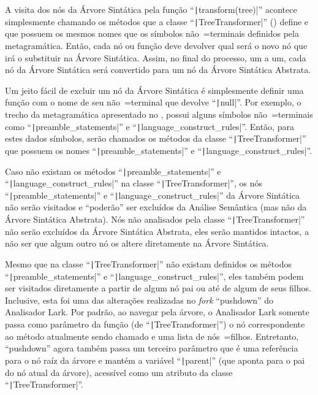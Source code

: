A visita dos nós da Árvore Sintática pela função ``\texttt|transform(tree)|'' acontece simplesmente chamando os métodos que a classe ``\texttt|TreeTransformer|'' () define e
que possuem os mesmos nomes que os símbolos não~=terminais definidos pela metagramática.
Então,
cada nó ou
função deve devolver qual será o novo nó que irá o substituir na Árvore Sintática.
Assim,
no final do processo,
um a um,
cada nó da Árvore Sintática será convertido para um nó da Árvore Sintática Abstrata.

Um jeito fácil de excluir um nó da Árvore Sintática é simplesmente definir uma função com o nome de seu não~=terminal que devolve ``\texttt|null|''.
Por exemplo,
o trecho da metagramática apresentado no ,
possui alguns símbolos não~=terminais como ``\texttt|preamble_statements|'' e
``\texttt|language_construct_rules|''. Então,
para estes dados símbolos,
serão chamados os métodos da classe ``\texttt|TreeTransformer|'' que possuem os nomes ``\texttt|preamble_statements|'' e
``\texttt|language_construct_rules|''.

Caso não existam os métodos ``\texttt|preamble_statements|'' e
``\texttt|language_construct_rules|'' na classe ``\texttt|TreeTransformer|'',
os nós ``\texttt|preamble_statements|'' e
``\texttt|language_construct_rules|'' da Árvore Sintática não serão visitados e
``poderão'' ser excluídos da Análise Semântica (mas não da Árvore Sintática Abstrata).
Nós não analisados pela classe ``\texttt|TreeTransformer|'' não serão excluídos da Árvore Sintática Abstrata,
eles serão mantidos intactos,
a não ser que algum outro nó os altere diretamente na Árvore Sintática.

Mesmo que na classe ``\texttt|TreeTransformer|'' não existam definidos os métodos ``\texttt|preamble_statements|'' e
``\texttt|language_construct_rules|'',
eles também podem ser visitados diretamente a partir de algum nó pai ou
até de algum de seus filhos.
Inclusive,
esta foi uma das alterações realizadas no \textit{fork} ``pushdown'' do Analisador Lark.
Por padrão,
ao navegar pela árvore,
o Analisador Lark somente passa como parâmetro da função (de ``\texttt|TreeTransformer|'') o nó correspondente ao método atualmente sendo chamado e
uma lista de nós~=filhos.
Entretanto,
``pushdown'' agora também passa um terceiro parâmetro que é uma referência para o nó raíz da árvore e
mantém a variável ``\texttt|parent|'' (que aponta para o pai do nó atual da árvore),
acessível como um atributo da classe ``\texttt|TreeTransformer|''.


